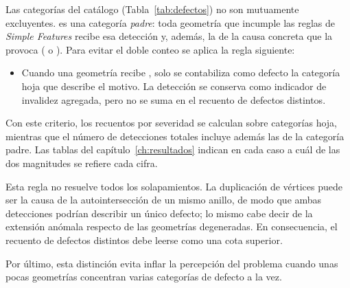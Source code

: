 Las categorías del catálogo (Tabla~\ref{tab:defectos}) no son mutuamente excluyentes.  es una categoría \emph{padre}: toda geometría que incumple las reglas de \emph{Simple Features} recibe esa detección y, además, la de la causa concreta que la provoca ( o ). Para evitar el doble conteo se aplica la regla siguiente:

\begin{itemize}[leftmargin=1.5em]
	\item Cuando una geometría recibe , solo se contabiliza como defecto la categoría hoja que describe el motivo. La detección  se conserva como indicador de invalidez agregada, pero no se suma en el recuento de defectos distintos.
\end{itemize}

Con este criterio, los recuentos por severidad se calculan sobre categorías hoja, mientras que el número de detecciones totales incluye además las de la categoría padre. Las tablas del capítulo~\ref{ch:resultados} indican en cada caso a cuál de las dos magnitudes se refiere cada cifra.

Esta regla no resuelve todos los solapamientos. La duplicación de vértices puede ser la causa de la autointersección de un mismo anillo, de modo que ambas detecciones podrían describir un único defecto; lo mismo cabe decir de la extensión anómala respecto de las geometrías degeneradas. En consecuencia, el recuento de defectos distintos debe leerse como una cota superior.

Por último, esta distinción evita inflar la percepción del problema cuando unas pocas geometrías concentran varias categorías de defecto a la vez.
